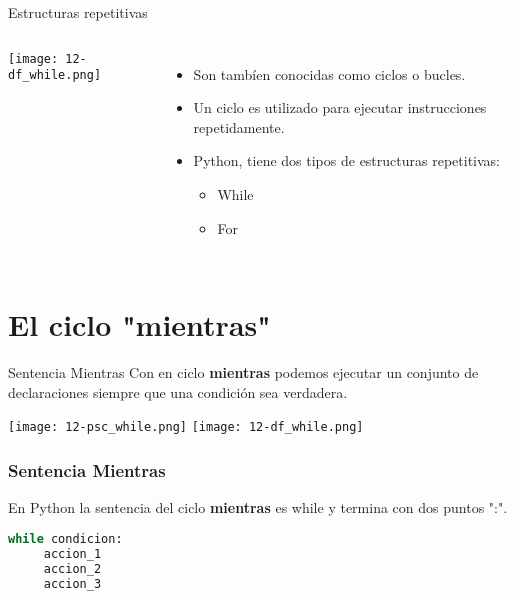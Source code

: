 
\begin{frame}[c]{Estructuras repetitivas}
  \begin{columns}
      \begin{center}
        \texttt{[image: 12-df\_while.png]}
      \end{center}
    \begin{itemize}
      \item Son tambíen conocidas como ciclos o bucles.
      \pausa
      \item Un ciclo es utilizado para ejecutar instrucciones repetidamente.
      \pausa
      \item Python, tiene dos tipos de estructuras repetitivas:
        \begin{itemize}
          \item While
          \item For
        \end{itemize}
    \end{itemize}
  \end{columns}
\end{frame}

\section{El ciclo "mientras"}

\begin{frame}[c]{Sentencia Mientras}
  Con en ciclo \textbf{mientras} podemos ejecutar un conjunto de
  declaraciones siempre que una condición sea verdadera.

  \pausa
  \vspace{\baselineskip}
  \texttt{[image: 12-psc\_while.png]}
  \pausa
  \texttt{[image: 12-df\_while.png]}
\end{frame}

\begin{frame}[fragile]
  \frametitle{Sentencia Mientras}

  En Python la sentencia del ciclo \textbf{mientras} es
  \textcolor{codeKeyword}{while} y termina con dos puntos ":".

  \vspace{\baselineskip}
  \begin{lstlisting}[language=Python]
  while condicion:
     accion_1
     accion_2
     accion_3
  \end{lstlisting}
\end{frame}

